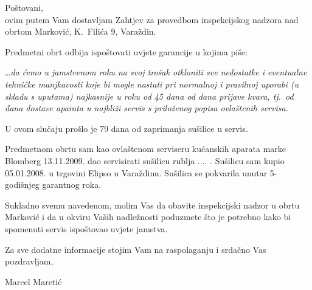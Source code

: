 \documentclass[12pt]{minimal}
\begin{document}
\noindent
Poštovani,\\
ovim putem Vam dostavljam Zahtjev za provedbom inspekcijskog nadzora nad obrtom Marković, K.~Filića 9, Varaždin.

\bigskip 

Predmetni obrt odbija ispoštovati uvjete garancije u kojima piše:

\medskip

 \dots \textit{da ćemo u jamstvenom roku na svoj trošak otkloniti sve nedostatke i eventualne tehničke manjkavosti koje bi mogle nastati pri normalnoj i pravilnoj uporabi (u skladu s uputama) najkasnije u roku od 45 dana od dana prijave kvara, tj.~od dana dostave aparata u najbliži servis s priloženog popisa ovlaštenih servisa.}

\medskip 

% 
% 
U ovom slučaju prošlo je 79 dana od zaprimanja sušilice u servis.

\bigskip 

Predmetnom obrtu sam kao ovlaštenom serviseru kućanskih aparata marke Blomberg 13.11.2009. dao servisirati sušilicu rublja .... .
Sušilicu sam kupio 05.01.2008. u trgovini Elipso u Varaždinu. Sušilica se pokvarila unutar 5-godišnjeg garantnog roka.


\bigskip

\bigskip 

Sukladno svemu navedenom, molim Vas da obavite inspekcijski nadzor u obrtu Marković i da u okviru Vaših nadležnosti poduzmete što je potrebno kako bi spomenuti servis ispoštovao uvjete jamstva.

\medskip

Za sve dodatne informacije stojim Vam na raspolaganju i srdačno Vas pozdravljam,\\

\bigskip
        \strut \hfill Marcel Maretić
\end{document}
